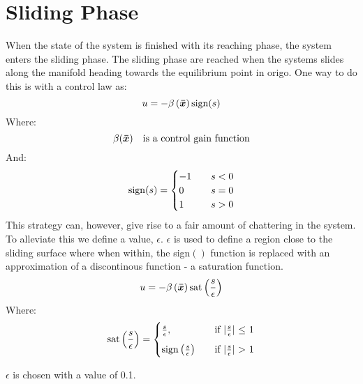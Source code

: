 \chapter{Sliding Phase}
When the state of the system is finished with its reaching phase, the system enters the sliding phase. The sliding phase are reached when the systems slides along the manifold heading towards the equilibrium point in origo. One way to do this is with a control law as:
\begin{equation}
  u = -\beta \left( \bm{\bar{x}} \right)\mathrm{sign}(s)
\end{equation}
Where:
\begin{equation}
  \beta (\bm{\bar{x}}) \quad\text{is a control gain function}
\nonumber
\end{equation}
And:
\begin{equation}
  \mathrm{sign}(s) =
  \begin{cases}
    -1 & \quad s < 0 \\
     0 & \quad s = 0 \\
     1 & \quad s > 0
  \end{cases}
\nonumber
\end{equation}
This strategy can, however, give rise to a fair amount of chattering in the system. To alleviate this we define a value, $\epsilon$. $\epsilon$ is used to define a region close to the sliding surface where when within, the sign$()$ function is replaced with an approximation of a discontinous function - a saturation function.
\begin{equation}
  u = -\beta\left( \bm{\bar{x}} \right) \mathrm{sat}\left( \frac{s}{\epsilon} \right)
\end{equation}
Where:
\begin{equation}
  \mathrm{sat}\left( \frac{s}{\epsilon} \right) =
  \begin{cases}
    \frac{s}{\epsilon}, &\quad \text{if $\vert\frac{s}{\epsilon}\vert$ $\leq$ 1} \\[2mm]
    \mathrm{sign}\left( \frac{s}{\epsilon} \right) &\quad \text{if $\vert \frac{s}{\epsilon}\vert$ $>$ 1}
  \end{cases}
\end{equation}

$\epsilon$ is chosen with a value of 0.1.
